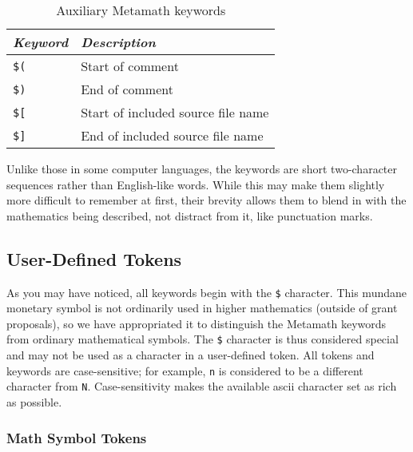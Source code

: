 \begin{table}[htp] \caption{Auxiliary Metamath
keywords} \label{otherkeywords}
\begin{center}
\begin{tabular}{|p{4pc}|l|}
\hline
\em \centering Keyword&\em Description\\
\hline
\hline
\centering
   \texttt{\$(}&Start of comment\\
\hline
\centering
   \texttt{\$)}&End of comment\\
\hline
\centering
   \texttt{\$[}&Start of included source file name\\
\hline
\centering
   \texttt{\$]}&End of included source file name\\
\hline
\end{tabular}
\end{center}
\end{table}


Unlike those in some computer languages, the keywords are short
two-character sequences rather than English-like words.  While this may make
them slightly more difficult to remember at first, their brevity allows
them to blend in with the mathematics being described, not
distract from it, like punctuation marks.


\subsection{User-Defined Tokens}\label{dollardollar}

As you may have noticed, all keywords begin with the \texttt{\$}
character.  This mundane monetary symbol is not ordinarily used in higher
mathematics (outside of grant proposals), so we have appropriated it to
distinguish the Metamath keywords from ordinary mathematical
symbols. The \texttt{\$} character is thus considered special and may not be
used as a character in a user-defined token.  All tokens and keywords are
case-sensitive; for example, \texttt{n} is considered to be a different character
from \texttt{N}.  Case-sensitivity makes the available {\sc ascii} character set
as rich as possible.

\subsubsection{Math Symbol Tokens}

